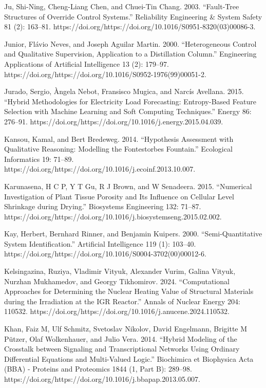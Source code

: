 \documentclass[utf8]{gradu3}
\begin{document}
Ju, Shi-Ning, Cheng-Liang Chen, and Chuei-Tin Chang. 2003. “Fault-Tree Structures of Override Control Systems.” Reliability Engineering \& System Safety 81 (2): 163–81. https://doi.org/https://doi.org/10.1016/S0951-8320(03)00086-3.

Junior, Flávio Neves, and Joseph Aguilar Martin. 2000. “Heterogeneous Control and Qualitative Supervision, Application to a Distillation Column.” Engineering Applications of Artificial Intelligence 13 (2): 179–97. https://doi.org/https://doi.org/10.1016/S0952-1976(99)00051-2.

Jurado, Sergio, Àngela Nebot, Fransisco Mugica, and Narcís Avellana. 2015. “Hybrid Methodologies for Electricity Load Forecasting: Entropy-Based Feature Selection with Machine Learning and Soft Computing Techniques.” Energy 86: 276–91. https://doi.org/https://doi.org/10.1016/j.energy.2015.04.039.

Kansou, Kamal, and Bert Bredeweg. 2014. “Hypothesis Assessment with Qualitative Reasoning: Modelling the Fontestorbes Fountain.” Ecological Informatics 19: 71–89. https://doi.org/https://doi.org/10.1016/j.ecoinf.2013.10.007.

Karunasena, H C P, Y T Gu, R J Brown, and W Senadeera. 2015. “Numerical Investigation of Plant Tissue Porosity and Its Influence on Cellular Level Shrinkage during Drying.” Biosystems Engineering 132: 71–87. https://doi.org/https://doi.org/10.1016/j.biosystemseng.2015.02.002.

Kay, Herbert, Bernhard Rinner, and Benjamin Kuipers. 2000. “Semi-Quantitative System Identification.” Artificial Intelligence 119 (1): 103–40. https://doi.org/https://doi.org/10.1016/S0004-3702(00)00012-6.

Kelsingazina, Ruziya, Vladimir Vityuk, Alexander Vurim, Galina Vityuk, Nurzhan Mukhamedov, and Georgy Tikhomirov. 2024. “Computational Approaches for Determining the Nuclear Heating Value of Structural Materials during the Irradiation at the IGR Reactor.” Annals of Nuclear Energy 204: 110532. https://doi.org/https://doi.org/10.1016/j.anucene.2024.110532.

Khan, Faiz M, Ulf Schmitz, Svetoslav Nikolov, David Engelmann, Brigitte M Pützer, Olaf Wolkenhauer, and Julio Vera. 2014. “Hybrid Modeling of the Crosstalk between Signaling and Transcriptional Networks Using Ordinary Differential Equations and Multi-Valued Logic.” Biochimica et Biophysica Acta (BBA) - Proteins and Proteomics 1844 (1, Part B): 289–98. https://doi.org/https://doi.org/10.1016/j.bbapap.2013.05.007.
\end{document}
